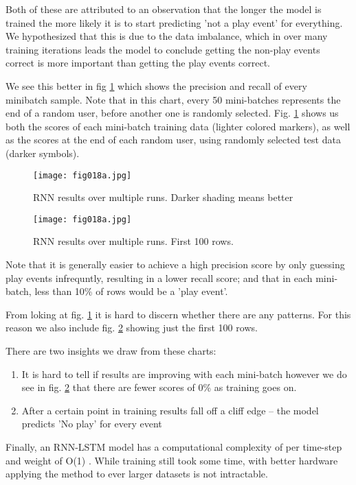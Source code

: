 Both of these are attributed to an observation that the longer the model is trained the more likely it is to start predicting 'not a play event' for everything. We hypothesized that this is due to the data imbalance, which in over many training iterations leads the model to conclude getting the non-play events correct is more important than getting the play events correct.






We see this better in fig \ref{fig18a} which shows the precision and recall of every minibatch sample. Note that in this chart, every 50 mini-batches represents the end of a random user, before another one is randomly selected. Fig. \ref{fig18a} shows us both the scores of each mini-batch training data (lighter colored markers), as well as the scores at the end of each random user, using randomly selected test data (darker symbols).

\begin{figure}[h!]
	\centering
	\texttt{[image: fig018a.jpg]}
	\caption{RNN results over multiple runs. Darker shading means better}
	\label{fig18a}
\end{figure}

\begin{figure}[h!]
	\centering
	\texttt{[image: fig018a.jpg]}
	\caption{RNN results over multiple runs. First 100 rows.}
	\label{fig18b}
\end{figure}

Note that it is generally easier to achieve a high precision score by only guessing play events infrequntly, resulting in a lower recall score; and that in each mini-batch, less than 10\% of rows would be a 'play event'. 

From loking at fig. \ref{fig18a} it is hard to discern whether there are any patterns. For this reason we also include fig. \ref{fig18b} showing just the first 100 rows.

There are two insights we draw from these charts:
\begin{enumerate}
	\item It is hard to tell if results are improving with each mini-batch however we do see in fig. \ref{fig18b} that there are fewer scores of 0\% as training goes on.
	\item After a certain point in training results fall off a cliff edge -- the model predicts 'No play' for every event
\end{enumerate}
 



Finally, an RNN-LSTM model has a computational complexity of per time-step and weight of O(1) \parencite{gers1999learning}. While training still took some time, with better hardware applying the method to ever larger datasets is not intractable.